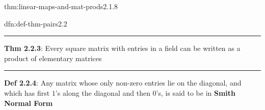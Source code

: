 \documentclass[landscape, 8pt]{extarticle}
\begin{document}
\begin{multicols}{3}
\begin{thm}{thm:linear-maps-and-mat-prods}{2.1.8}
\end{thm}



\begin{dfn}{dfn:def-thm-pairs}{2.2}

    \vspace{-5pt}

    \vspace{-5pt}
    \noindent\rule{\textwidth}{0.2pt}
    \textbf{Thm 2.2.3}: Every square matrix with entries in a field can be written as a product of elementary matrices

    \noindent\rule{\textwidth}{0.6pt}
    \textbf{Def 2.2.4}: Any matrix whose only non-zero entries lie on the diagonal, and which has first $1$'s along the diagonal and then $0$'s, is said to be in \textbf{Smith Normal Form}


\end{dfn}
\end{multicols}
\end{document}
